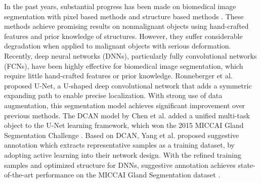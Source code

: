 \documentclass[10pt,twocolumn,letterpaper]{article}
\begin{document}
In the past years, substantial progress has been made on biomedical image segmentation with pixel based methods \cite{doyle2006boosting,nguyen2012structure,tabesh2007multifeature,sirinukunwattana2015novel} and structure based methods \cite{altunbay2010color,gunduz2010automatic,fu2014novel,sirinukunwattana2015stochastic}.
These methods achieve promising results on nonmalignant objects using hand-crafted features and prior knowledge of structures.
However, they suffer considerable degradation when applied to malignant objects with serious deformation.
Recently, deep neural networks (DNNs), particularly fully convolutional networks (FCNs), have been highly effective for biomedical image segmentation, which require little hand-crafted features or prior knowledge.
Ronneberger et al. \cite{ronneberger2015u} proposed U-Net, a U-shaped deep convolutional network that adds a symmetric expanding path to enable precise localization.
With strong use of data augmentation, this segmentation model achieves significant improvement over previous methods.
The DCAN model by Chen et al. \cite{chen2016deep,chen2016dcan} added a unified multi-task object to the U-Net learning framework, which won the 2015 MICCAI Gland Segmentation Challenge \cite{sirinukunwattana2017gland}.
Based on DCAN, Yang et al. \cite{yang2017suggestive} proposed suggestive annotation which extracts representative samples as a training dataset, by adopting active learning into their network design.
With the refined training samples and optimized structure for DNNs, suggestive annotation achieves state-of-the-art performance on the MICCAI Gland Segmentation dataset \cite{sirinukunwattana2017gland}.



\end{document}

